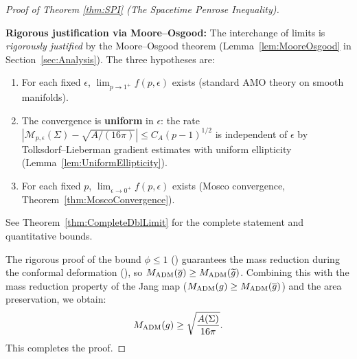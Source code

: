 \begin{proof}[Proof of Theorem \ref{thm:SPI} (The Spacetime Penrose Inequality)]
\begin{remark}
\textbf{Rigorous justification via Moore--Osgood:} The interchange of limits is \emph{rigorously justified} by the Moore--Osgood theorem (Lemma~\ref{lem:MooreOsgood} in Section~\ref{sec:Analysis}). The three hypotheses are:
\begin{enumerate}
    \item[(MO1)] For each fixed $\epsilon$, $\lim_{p \to 1^+} f(p,\epsilon)$ exists (standard AMO theory on smooth manifolds).
    \item[(MO2)] The convergence is \textbf{uniform} in $\epsilon$: the rate $|\mathcal{M}_{p,\epsilon}(\Sigma) - \sqrt{A/(16\pi)}| \le C_A(p-1)^{1/2}$ is independent of $\epsilon$ by Tolksdorf--Lieberman gradient estimates with uniform ellipticity (Lemma~\ref{lem:UniformEllipticity}).
    \item[(MO3)] For each fixed $p$, $\lim_{\epsilon \to 0^+} f(p,\epsilon)$ exists (Mosco convergence, Theorem~\ref{thm:MoscoConvergence}).
\end{enumerate}
See Theorem~\ref{thm:CompleteDblLimit} for the complete statement and quantitative bounds.
\end{remark}

The rigorous proof of the bound $\phi \le 1$ () guarantees the mass reduction during the conformal deformation (), so $M_{\mathrm{ADM}}(\overline{g}) \ge M_{\mathrm{ADM}}(\widetilde{g})$.
Combining this with the mass reduction property of the Jang map ($M_{\mathrm{ADM}}(g) \ge M_{\mathrm{ADM}}(\overline{g})$) and the area preservation, we obtain:
\[ M_{\mathrm{ADM}}(g) \ge \sqrt{\frac{A(\Sigma)}{16\pi}}. \]
This completes the proof.
\end{proof}

